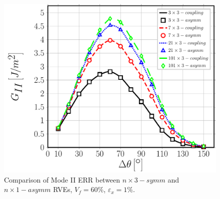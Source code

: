 \begin{figure}[!htb]
\centering
  \includegraphics[width=\textwidth]{paperD/nxk-coupling-vf60-GII.pdf}
\caption{Comparison of Mode II ERR between $n \times 3-symm$ and $n \times 1-asymm$ RVEs, $V_{f}=60\%$, $\varepsilon_{x}=1\%$.}\label{paperD:fig:nxk-GII}
\end{figure}

